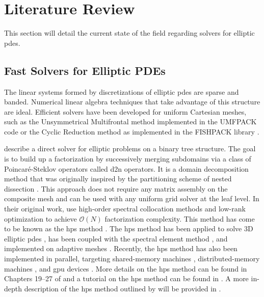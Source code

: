 \section{Literature Review}

This section will detail the current state of the field regarding solvers for elliptic \gls{pdes}. 

\subsection{Fast Solvers for Elliptic PDEs}

The linear systems formed by discretizations of elliptic \gls{pdes} are sparse and banded. Numerical linear algebra techniques that take advantage of this structure are ideal. Efficient solvers have been developed for uniform Cartesian meshes, such as the Unsymmetrical Multifrontal method implemented in the UMFPACK code \citep{davis2004algorithm} or the Cyclic Reduction method \citep{swarztrauber1974direct} as implemented in the FISHPACK library \citep{swarztrauber1999fishpack,adams2016fishpack90}.

\citet{gillman2014direct} describe a direct solver for elliptic problems on a binary tree structure. The goal is to build up a factorization by successively merging subdomains via a class of Poincar\'e-Steklov operators \citep{quarteroni1991theory} called \gls{d2n} operators. It is a domain decomposition method that was originally inspired by the partitioning scheme of nested dissection \citep{george1973nested,lipton1979generalized}. This approach does not require any matrix assembly on the composite mesh and can be used with any uniform grid solver at the leaf level. In their original work, \citet{gillman2014direct} use high-order spectral collocation methods and low-rank optimization to achieve $\mathcal O(N)$ factorization complexity. This method has come to be known as the \gls{hps} method \citep{martinsson2015hierarchical}. The \gls{hps} method has been applied to solve 3D elliptic \gls{pdes} \citep{hao2016direct}, has been coupled with the spectral element method \citep{fortunato2020ultraspherical}, and implemented on adaptive meshes \citep{babb2018accelerated, geldermans2019adaptive,chipman2024fast}. Recently, the \gls{hps} method has also been implemented in parallel, targeting shared-memory machines \citep{beams2020parallel}, distributed-memory machines \citep{yesypenko2022parallel}, and \gls{gpu} devices \citep{yesypenko2022gpu}. More details on the \gls{hps} method can be found in Chapters 19--27 of \citep{martinsson2019fast} and a tutorial on the \gls{hps} method can be found in \citep{martinsson2015hierarchical}. A more in-depth description of the \gls{hps} method outlined by \citet{gillman2014direct} will be provided in .

